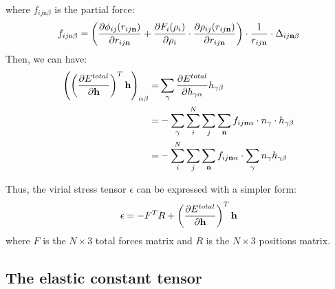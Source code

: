 \documentclass[prb,preprint]{revtex4-2}
\begin{document}
where $f_{ij\mathrm{n}\beta}$ is the partial force:
\begin{equation}
f_{ij\mathrm{n}\beta} = \left(
    \frac{\partial \phi_{ij}(r_{ij\mathbf{n}})}{\partial r_{ij\mathbf{n}}} +
    \frac{\partial F_{i}(\rho_{i})}{\partial \rho_{i}} \cdot 
    \frac{\partial \rho_{ij}(r_{ij\mathbf{n}})}{\partial r_{ij\mathbf{n}}}
\right) \cdot 
\frac{1}{r_{ij\mathbf{n}}} \cdot \Delta_{ij\mathbf{n}\beta}
\end{equation}
Then, we can have:
\begin{align}
\label{eq:dEdhTh_g2_expanded}
\left(
    \left(\frac{\partial E^{total}}{\partial \mathbf{h}}\right)^T \mathbf{h}
\right)_{\alpha\beta} = &
\sum_{\gamma}{\frac{\partial E^{total}}{\partial h_{\gamma\alpha}} h_{\gamma\beta}} \nonumber \\
= & -\sum_{\gamma}{\sum_{i}^{N}{
        \sum_{j}{\sum_{\mathbf{n}}{f_{ij\mathbf{n}\alpha} \cdot n_{\gamma}
    }}} \cdot h_{\gamma\beta}
} \nonumber \\
= & -\sum_{i}^{N}{
    \sum_{j}{\sum_{\mathbf{n}}{f_{ij\mathbf{n}\alpha} \cdot \sum_{\gamma}{ 
        n_{\gamma} h_{\gamma\beta}
    }
}}}
\end{align}

Thus, the virial stress tensor $\epsilon$ can be expressed with a simpler form:
\begin{equation}
\epsilon = -F^{T}R + \left(\frac{\partial E^{total}}{\partial \mathbf{h}}\right)^T \mathbf{h}
\end{equation}
where $F$ is the $N \times 3$ total forces matrix and $R$ is the $N \times 3$ 
positions matrix.

\subsection{The elastic constant tensor}
\end{document}
